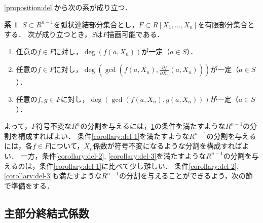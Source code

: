 \documentclass[uplatex, dvipdfmx]{jsarticle}
\numberwithin{equation}{section}
\theoremstyle{definition}
\newtheorem{corollary}[definition]{系}
\begin{document}
\cref{proposition:del}から次の系が成り立つ．

\begin{corollary}\label{corollary:del}
     $S \subset R^{n-1}$を弧状連結部分集合とし，$F \subset R[X_1,\dots, X_n]$を有限部分集合とする．
     次が成り立つとき，$S$は$F$描画可能である．
     \begin{enumerate}
          \item \label{corollary:del-1}
          任意の$f \in F$に対し，$\deg(f(a,X_n))$が一定（$a \in S$）．
          \item \label{corollary:del-2}
          任意の$f \in F$に対し，$\deg(\gcd(f(a,X_n), \frac{\partial f}{\partial X_n}(a,X_n)))$が一定（$a \in S$）．
          \item \label{corollary:del-3}
          任意の$f, g \in F$に対し，$\deg(\gcd(f(a,X_n), g(a,X_n)))$が一定（$a \in S$）．
     \end{enumerate}
\end{corollary}

よって，$F$符号不変な$R^n$の分割を与えるには，\cref{corollary:del}の条件を満たすような$R^{n-1}$の分割を構成すればよい．
条件\ref{corollary:del-1}を満たすような$R^{n-1}$の分割を与えるには，各$f \in F$について，$X_n$係数が符号不変になるような分割を構成すればよい．
一方，条件\ref{corollary:del-2}, \ref{corollary:del-3}を満たすような$R^{n-1}$の分割を与えるのは，条件\ref{corollary:del-1}に比べて少し難しい．
条件\ref{corollary:del-2}, \ref{corollary:del-3}も満たすような$R^{n-1}$の分割を与えることができるよう，次の節で準備をする．

\subsection{主部分終結式係数}

\end{document}
